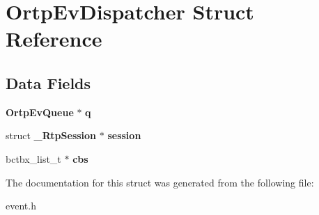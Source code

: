 \section{Ortp\+Ev\+Dispatcher Struct Reference}
\label{structOrtpEvDispatcher}
\subsection*{Data Fields}
\begin{DoxyCompactItemize}
\item 
\mbox{\label{structOrtpEvDispatcher_acdb04a1fc4fea773c8ab1a415fa73511}} 
\textbf{ Ortp\+Ev\+Queue} $\ast$ {\bfseries q}
\item 
\mbox{\label{structOrtpEvDispatcher_afb85ab49d02049c7eea05ea14c8b1aeb}} 
struct \textbf{ \+\_\+\+Rtp\+Session} $\ast$ {\bfseries session}
\item 
\mbox{\label{structOrtpEvDispatcher_a46a325c111766a5072fc84ea48937044}} 
bctbx\+\_\+list\+\_\+t $\ast$ {\bfseries cbs}
\end{DoxyCompactItemize}


The documentation for this struct was generated from the following file\+:\begin{DoxyCompactItemize}
\item 
event.\+h\end{DoxyCompactItemize}

